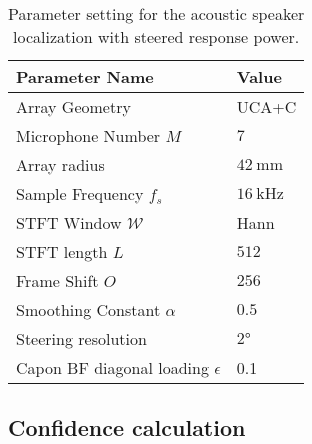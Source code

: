 \begin{table}[!ht]
	\centering
	\begin{tabular}{ll}
		\toprule
		Parameter Name      & Value                     \\ \midrule
		Array Geometry      & UCA+C                     \\
		Microphone Number $M$  & $7$                         \\
		Array radius        & $\SI{42}{\milli\metre}$ \\
		Sample Frequency $f_s$   & $\SI{16}{\kHz}$         \\
		STFT Window $\mathcal{W}$         & Hann                      \\
		STFT length $L$         & $512$                       \\
		Frame Shift $O$		& $256$\\
		Smoothing Constant $\alpha$ & $0.5$                      \\
		Steering resolution & $\ang{2}  $               \\
		Capon BF diagonal loading $\epsilon$ & 0.1 \\
		\bottomrule
	\end{tabular}
	\caption{Parameter setting for the acoustic speaker localization with steered response power.}
	\label{tab:setup_asl}
\end{table}


\subsection{Confidence calculation}

